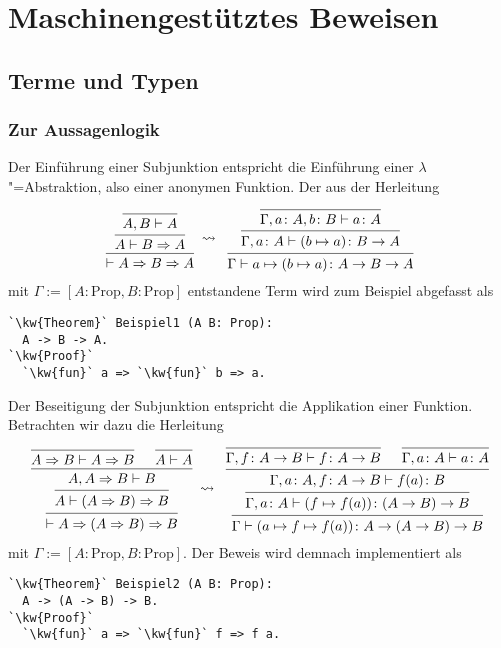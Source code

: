 
\chapter{Maschinengestütztes Beweisen}

\section{Terme und Typen}

\subsection{Zur Aussagenlogik}

Der Einführung einer Subjunktion entspricht die
Einführung einer $\lambda$"=Abstraktion,%
 also einer anonymen Funktion.%
 Der aus der Herleitung
\[\begin{prooftree}
    \infer0{A,B\vdash A}
  \infer1{A\vdash B\cond A}
\infer1{\vdash A\cond B\cond A}
\end{prooftree}
\;\rightsquigarrow\;\;
\begin{prooftree}
    \infer0{\Gamma, a\colon A, b\colon B\vdash a\colon A}
  \infer1{\Gamma, a\colon A\vdash (b\mapsto a)\colon B\to A}
\infer1{\Gamma\vdash a\mapsto (b\mapsto a)\colon A\to B\to A}
\end{prooftree}\]
mit $\Gamma:=[A\colon\mathrm{Prop}, B\colon\mathrm{Prop}]$ entstandene
Term wird zum Beispiel abgefasst als
\begin{lstlisting}[escapechar=`, xleftmargin=\mathindent]
`\kw{Theorem}` Beispiel1 (A B: Prop):
  A -> B -> A.
`\kw{Proof}`
  `\kw{fun}` a => `\kw{fun}` b => a.
\end{lstlisting}
Der Beseitigung der Subjunktion entspricht die Applikation einer
Funktion. Betrachten wir dazu die Herleitung
\[\begin{prooftree}
      \infer0{A\cond B\vdash A\cond B}
      \infer0{A\vdash A}
    \infer2{A,A\cond B\vdash B}
  \infer1{A\vdash (A\cond B)\cond B}
\infer1{\vdash A\cond (A\cond B)\cond B}
\end{prooftree}
\;\rightsquigarrow\;\;
\begin{prooftree}
      \infer0{\Gamma,f\colon A\to B\vdash f\colon A\to B}
      \infer0{\Gamma,a\colon A\vdash a\colon A}
    \infer2{\Gamma,a\colon A, f\colon A\to B\vdash f(a)\colon B}
  \infer1{\Gamma,a\colon A\vdash (f\mapsto f(a))\colon (A\to B)\to B}
\infer1{\Gamma\vdash (a\mapsto f\mapsto f(a))\colon A\to (A\to B)\to B}
\end{prooftree}\]
mit $\Gamma:=[A\colon\mathrm{Prop}, B\colon\mathrm{Prop}]$.
Der Beweis wird demnach implementiert als
\begin{lstlisting}[escapechar=`, xleftmargin=\mathindent]
`\kw{Theorem}` Beispiel2 (A B: Prop):
  A -> (A -> B) -> B.
`\kw{Proof}`
  `\kw{fun}` a => `\kw{fun}` f => f a.
\end{lstlisting}

